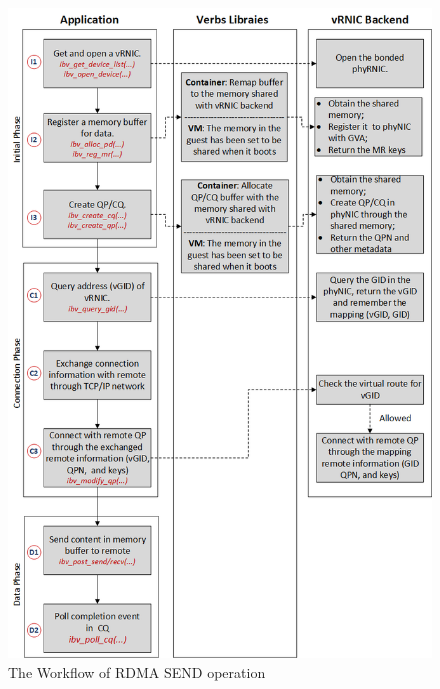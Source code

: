 \begin{figure}[!ht]
	\centering
	\includegraphics[width=1\linewidth]{images/RDMA-path.png}
	\caption{The Workflow of RDMA SEND operation}
	\label{fig:route-config}
\end{figure}



